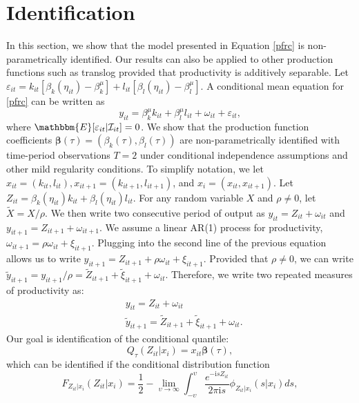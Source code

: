 \documentclass[12pt]{article}
\begin{document}
\section{Identification} \label{ident}
In this section, we show that the model presented in Equation \eqref{pfrc} is non-parametrically identified. Our results can also be applied to other production functions such as translog provided that productivity is additively separable. Let $\varepsilon_{it}=k_{it}[\beta_{k}(\eta_{it})-\beta^{\mu}_{k}]+l_{it}[\beta_{l}(\eta_{it})-\beta^{\mu}_{l}]$. A conditional mean equation for \eqref{pfrc} can be written as
\begin{equation}\label{meanversion}
y_{it}=\beta_{k}^{\mu}k_{it}+\beta_{l}^{\mu}l_{it}+\omega_{it}+\varepsilon_{it},
\end{equation}
where $\mathbbm{E}[\varepsilon_{it}|\mathcal{I}_{it}]=0$. We show that the production function coefficients $\boldsymbol{\beta}(\tau)=(\beta_{k}(\tau), \beta_{l}(\tau))$ are non-parametrically identified with time-period observations $T=2$ under conditional independence assumptions and other mild regularity conditions. To simplify notation, we let $x_{it}=(k_{it}, l_{it}), x_{it+1}=(k_{it+1}, l_{it+1})$, and $x_{i}=(x_{it}, x_{it+1})$. Let $Z_{it}=\beta_{k}(\eta_{it})k_{it}+\beta_{l}(\eta_{it})l_{it}$. For any random variable $X$ and $\rho\neq 0$, let $\tilde{X}=X/\rho$. We then write two consecutive period of output as $y_{it}=Z_{it}+\omega_{it}$ and $y_{it+1}=Z_{it+1}+\omega_{it+1}$. We assume a linear AR(1) process for productivity, $\omega_{it+1}=\rho\omega_{it}+\xi_{it+1}$. Plugging into the second line of the previous equation allows us to write $y_{it+1}=Z_{it+1}+\rho\omega_{it}+\xi_{it+1}$. Provided that $\rho\neq0$, we can write $\tilde{y}_{it+1}=y_{it+1}/\rho=\tilde{Z}_{it+1}+\tilde{\xi}_{it+1}+\omega_{it}$. Therefore, we write two repeated measures of productivity as:
\begin{equation} \label{repeatedmeas}
\begin{split}
&y_{it}=Z_{it}+\omega_{it}\\
&\tilde{y}_{it+1}=\tilde{Z}_{it+1}+\tilde{\xi}_{it+1}+\omega_{it}.
\end{split}
\end{equation}
Our goal is identification of the conditional quantile:
\begin{equation*}
Q_{\tau}(Z_{it}|x_{i})=x_{it}\boldsymbol\beta(\tau),
\end{equation*}
which can be identified if the conditional distribution function
\begin{equation}\label{CDF}
F_{Z_{it}|x_{i}}(Z_{it}|x_{i})=\frac{1}{2}-\underset{\upsilon\rightarrow \infty}{\operatorname{lim}}\int_{-\upsilon}^{\upsilon}\frac{e^{-\mathrm{i}sZ_{it}}}{2\pi \mathrm{i}s}\phi_{Z_{it}|x_{i}}(s|x_{i})ds,
\end{equation}
\end{document}
